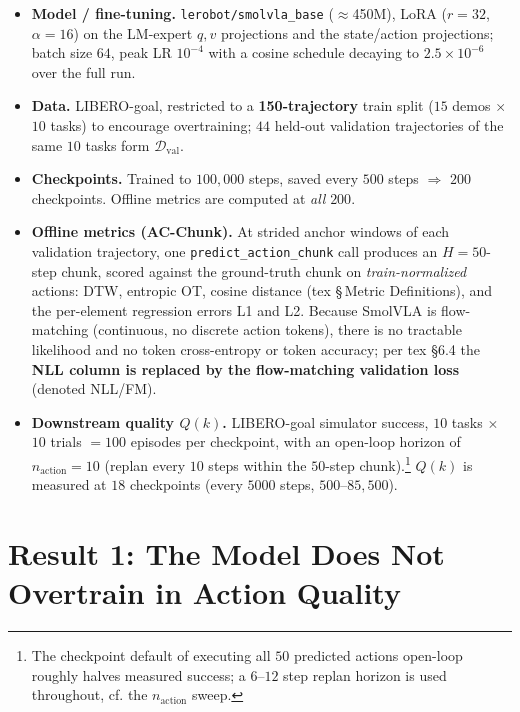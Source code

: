 \documentclass[11pt]{article}
\begin{document}
\begin{itemize}
  \item \textbf{Model / fine-tuning.} \texttt{lerobot/smolvla\_base} ($\approx$450M), LoRA
        ($r{=}32$, $\alpha{=}16$) on the LM-expert $q,v$ projections and the state/action projections;
        batch size $64$, peak LR $10^{-4}$ with a cosine schedule decaying to $2.5\times10^{-6}$ over
        the full run.
  \item \textbf{Data.} LIBERO-goal, restricted to a \textbf{150-trajectory} train split
        ($15$ demos $\times$ $10$ tasks) to encourage overtraining; $44$ held-out validation
        trajectories of the same $10$ tasks form $\mathcal{D}_{\mathrm{val}}$.
  \item \textbf{Checkpoints.} Trained to $100{,}000$ steps, saved every $500$ steps
        $\Rightarrow$ $200$ checkpoints. Offline metrics are computed at \emph{all} $200$.
  \item \textbf{Offline metrics (AC-Chunk).} At strided anchor windows of each validation trajectory,
        one \texttt{predict\_action\_chunk} call produces an $H{=}50$-step chunk, scored against the
        ground-truth chunk on \emph{train-normalized} actions: DTW, entropic OT, cosine distance
        (tex \S\,Metric Definitions), and the per-element regression errors L1 and L2. Because
        SmolVLA is flow-matching (continuous, no discrete action tokens), there is no tractable
        likelihood and no token cross-entropy or token accuracy; per tex \S6.4 the \textbf{NLL column
        is replaced by the flow-matching validation loss} (denoted NLL/FM).
  \item \textbf{Downstream quality $Q(k)$.} LIBERO-goal simulator success, $10$ tasks $\times$ $10$
        trials $=100$ episodes per checkpoint, with an open-loop horizon of
        $n_{\text{action}}{=}10$ (replan every $10$ steps within the $50$-step chunk).\footnote{The
        checkpoint default of executing all $50$ predicted actions open-loop roughly halves measured
        success; a $6$--$12$ step replan horizon is used throughout, cf. the $n_{\text{action}}$
        sweep.} $Q(k)$ is measured at $18$ checkpoints (every $5000$ steps, $500$--$85{,}500$).
\end{itemize}

\section{Result 1: The Model Does Not Overtrain in Action Quality}
\end{document}
